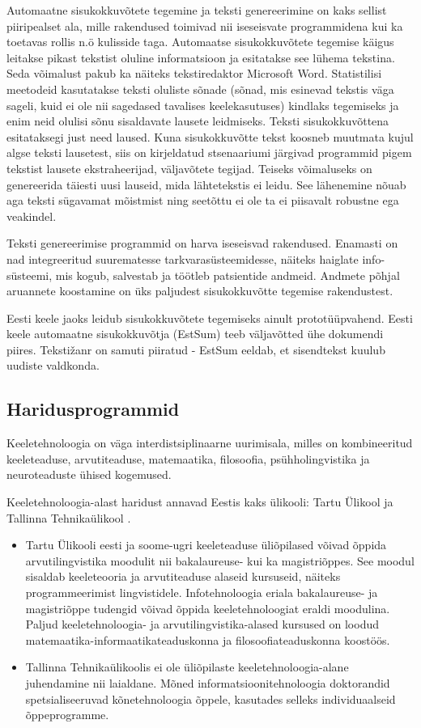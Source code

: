 \documentclass[]{../metanetpaper}
\begin{document}
\begin{multicols}{2}
Automaatne sisukokkuvõtete tegemine ja teksti genereerimine on kaks sellist piiripealset ala, mille rakendused toimivad nii iseseisvate programmidena kui ka toetavas rollis n.ö kulisside taga. 
Automaatse sisukokkuvõtete tegemise käigus leitakse pikast tekstist oluline informatsioon ja esitatakse see lühema tekstina. 
Seda võimalust pakub ka näiteks tekstiredaktor Microsoft Word. 
Statistilisi meetodeid kasutatakse teksti oluliste sõnade (sõnad, mis esinevad tekstis väga sageli, kuid ei ole nii sagedased tavalises keelekasutuses) kindlaks tegemiseks ja enim neid olulisi sõnu sisaldavate lausete leidmiseks. 
Teksti sisukokkuvõttena esitataksegi just need laused. 
Kuna sisukokkuvõtte tekst koosneb muutmata kujul algse teksti lausetest, siis on kirjeldatud stsenaariumi järgivad programmid pigem tekstist lausete ekstraheerijad, väljavõtete tegijad.
Teiseks võimaluseks on genereerida täiesti uusi lauseid, mida lähtetekstis ei leidu. 
See lähenemine nõuab aga teksti sügavamat mõistmist ning seetõttu ei ole ta ei piisavalt robustne ega veakindel. 

Teksti genereerimise programmid on harva iseseisvad rakendused. Enamasti on nad integreeritud suurematesse tarkvarasüsteemidesse, näiteks haiglate info- süsteemi, mis kogub, salvestab ja töötleb patsientide andmeid. 
Andmete põhjal aruannete koostamine on üks paljudest sisukokkuvõtte tegemise rakendustest. 

Eesti keele jaoks leidub sisukokkuvõtete tegemiseks ainult prototüüpvahend. 
Eesti keele automaatne sisukokkuvõtja (EstSum) teeb väljavõtted ühe dokumendi piires. Tekstižanr on samuti piiratud - EstSum eeldab, et sisendtekst kuulub uudiste valdkonda. 

\subsection{Haridusprogrammid}


Keeletehnoloogia on väga interdistsiplinaarne uurimisala, milles on kombineeritud keeleteaduse, arvutiteaduse, matemaatika, filosoofia, psühholingvistika ja neuroteaduste ühised kogemused. 

Keeletehnoloogia-alast haridust annavad Eestis kaks ülikooli: Tartu
Ülikool ja Tallinna Tehnikaülikool \cite{Meisteretal}.
\begin{itemize}
 \item Tartu Ülikooli eesti ja soome-ugri keeleteaduse üliõpilased võivad õppida arvutilingvistika moodulit nii bakalaureuse- kui ka magistriõppes. 
See moodul sisaldab keeleteooria ja arvutiteaduse alaseid kursuseid, näiteks programmeerimist lingvistidele. 
Infotehnoloogia eriala bakalaureuse- ja magistriõppe tudengid võivad õppida keeletehnoloogiat eraldi moodulina. 
Paljud keeletehnoloogia- ja arvutilingvistika-alased kursused on loodud matemaatika-informaatikateaduskonna ja filosoofiateaduskonna koostöös. 
 \item Tallinna Tehnikaülikoolis ei ole üliõpilaste keeletehnoloogia-alane juhendamine nii laialdane. 
Mõned informatsioonitehnoloogia doktorandid spetsialiseeruvad kõnetehnoloogia õppele, kasutades selleks indivi\-duaal\-seid õppeprogramme. 
\end{itemize}
  

\end{multicols}
\end{document}
